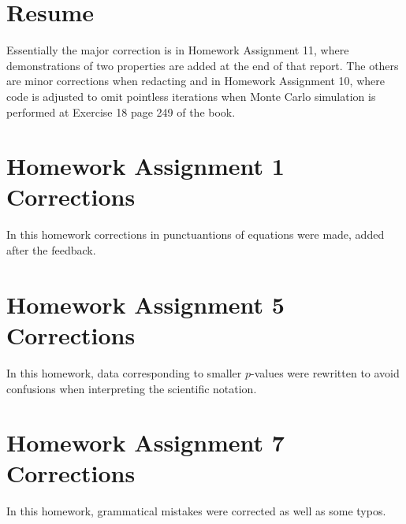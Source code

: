 \documentclass[10pt,leter,openany]{article}
\begin{document}
	
	

\section{Resume}
 Essentially the major correction is in Homework Assignment 11, where demonstrations of two properties are added at the end of that report. The others are minor corrections when redacting and in Homework Assignment 10, where code is adjusted to omit pointless iterations when Monte Carlo simulation is performed at Exercise 18 page 249 of the book.
 
\section*{Homework Assignment 1 Corrections}
	In this homework corrections in punctuantions of equations were made, added after the feedback. 
	
	
	
	
	
	
	
	
\section*{Homework Assignment 5 Corrections}
	In this homework, data corresponding to smaller $p$-values were rewritten to avoid confusions when interpreting the scientific notation.
	
	
	
	

\section*{Homework Assignment 7 Corrections}
	In this homework, grammatical mistakes were corrected as well as some typos.
	
	
	
\end{document}
